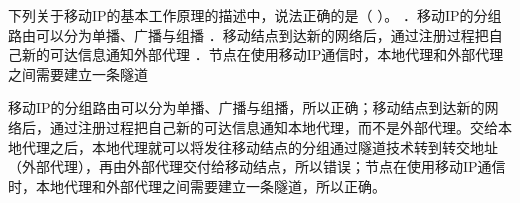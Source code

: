 \question 下列关于移动IP的基本工作原理的描述中，说法正确的是（ ）。
．移动IP的分组路由可以分为单播、广播与组播
．移动结点到达新的网络后，通过注册过程把自己新的可达信息通知外部代理
．节点在使用移动IP通信时，本地代理和外部代理之间需要建立一条隧道
\par{}
\begin{solution}移动IP的分组路由可以分为单播、广播与组播，所以正确；移动结点到达新的网络后，通过注册过程把自己新的可达信息通知本地代理，而不是外部代理。交给本地代理之后，本地代理就可以将发往移动结点的分组通过隧道技术转到转交地址（外部代理），再由外部代理交付给移动结点，所以错误；节点在使用移动IP通信时，本地代理和外部代理之间需要建立一条隧道，所以正确。
\end{solution}
